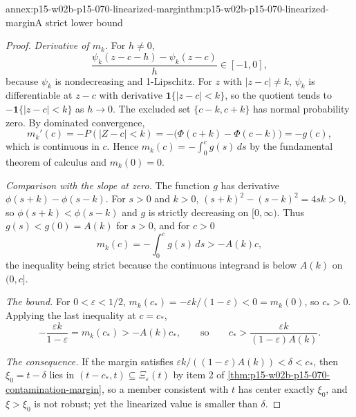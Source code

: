 \begin{annexitem}{annex:p15-w02b-p15-070-linearized-margin}{thm:p15-w02b-p15-070-linearized-margin}{A strict lower bound}
\begin{proof}
\emph{Derivative of \(m_k\).} For \(h\ne0\),
\[
 \frac{\psi_k(z-c-h)-\psi_k(z-c)}{h}\in[-1,0],
\]
because \(\psi_k\) is nondecreasing and 1-Lipschitz. For \(z\) with
\(|z-c|\ne k\), \(\psi_k\) is differentiable at \(z-c\) with derivative
\(\mathbf 1\{|z-c|<k\}\), so the quotient tends to
\(-\mathbf 1\{|z-c|<k\}\) as \(h\to0\). The excluded set
\(\{c-k,c+k\}\) has normal probability zero. By dominated convergence,
\[
 m_k'(c)=-P(|Z-c|<k)=-\bigl(\Phi(c+k)-\Phi(c-k)\bigr)=-g(c),
\]
which is continuous in \(c\). Hence \(m_k(c)=-\int_0^cg(s)\,ds\) by the
fundamental theorem of calculus and \(m_k(0)=0\).

\emph{Comparison with the slope at zero.} The function \(g\) has
derivative \(\phi(s+k)-\phi(s-k)\). For \(s>0\) and \(k>0\),
\((s+k)^2-(s-k)^2=4sk>0\), so \(\phi(s+k)<\phi(s-k)\) and \(g\) is
strictly decreasing on \([0,\infty)\). Thus \(g(s)<g(0)=A(k)\) for
\(s>0\), and for \(c>0\)
\[
 m_k(c)=-\int_0^cg(s)\,ds>-A(k)c,
\]
the inequality being strict because the continuous integrand is below
\(A(k)\) on \((0,c]\).

\emph{The bound.} For \(0<\varepsilon<1/2\),
\(m_k(c_*)=-\varepsilon k/(1-\varepsilon)<0=m_k(0)\), so \(c_*>0\).
Applying the last inequality at \(c=c_*\),
\[
 -\frac{\varepsilon k}{1-\varepsilon}=m_k(c_*)>-A(k)c_*,
 \qquad\text{so}\qquad
 c_*>\frac{\varepsilon k}{(1-\varepsilon)A(k)}.
\]

\emph{The consequence.} If the margin satisfies
\(\varepsilon k/((1-\varepsilon)A(k))<\delta<c_*\), then
\(\xi_0=t-\delta\) lies in \((t-c_*,t)\subseteq\Xi_\varepsilon(t)\) by
item 2 of \cref{thm:p15-w02b-p15-070-contamination-margin}, so a member
consistent with \(t\) has center exactly \(\xi_0\), and \(\xi>\xi_0\) is
not robust; yet the linearized value is smaller than \(\delta\).


\end{proof}
\end{annexitem}
